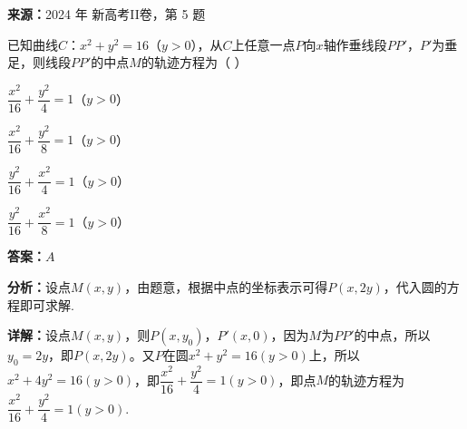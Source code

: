 \begin{question}[points=5]
\textbf{来源：}2024 年 新高考II卷，第 5 题\par
已知曲线$C：x^2+y^2=16$（$y>0$），从$C$上任意一点$P$向$x$轴作垂线段$PP'$，$P'$为垂足，则线段$PP'$的中点$M$的轨迹方程为（ ）
\begin{choices}
  \item $\dfrac{x^2}{16}+\dfrac{y^2}{4}=1$（$y>0$）
  \item $\dfrac{x^2}{16}+\dfrac{y^2}{8}=1$（$y>0$）
  \item $\dfrac{y^2}{16}+\dfrac{x^2}{4}=1$（$y>0$）
  \item $\dfrac{y^2}{16}+\dfrac{x^2}{8}=1$（$y>0$）
\end{choices}
\begin{solution}
\textbf{答案：}$A$

\textbf{分析：}设点$M(x,y)$，由题意，根据中点的坐标表示可得$P(x,2y)$，代入圆的方程即可求解.

\textbf{详解：}设点$M(x,y)$，则$P(x,y_0)$，$P'(x,0)$，因为$M$为$PP'$的中点，所以$y_0=2y$，即$P(x,2y)$。又$P$在圆$x^2+y^2=16(y>0)$上，所以$x^2+4y^2=16(y>0)$，即$\dfrac{x^2}{16}+\dfrac{y^2}{4}=1(y>0)$，即点$M$的轨迹方程为$\dfrac{x^2}{16}+\dfrac{y^2}{4}=1(y>0)$.
\end{solution}
\end{question}


